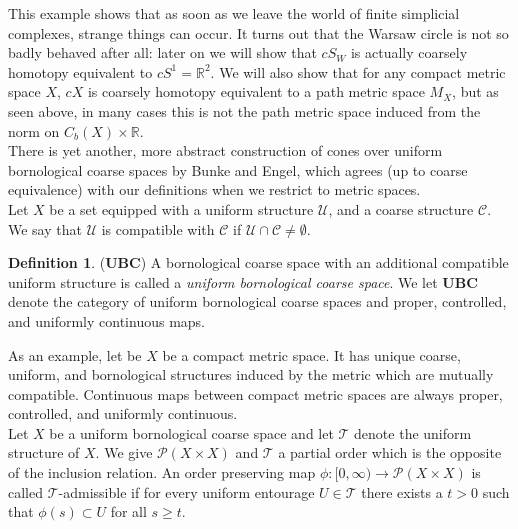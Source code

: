 \documentclass[a4paper,11pt]{article}
\theoremstyle{definition}
\newtheorem{definition}{Definition}[section]
\theoremstyle{plain}
\theoremstyle{remark}
\begin{document}
This example shows that as soon as we leave the world of finite simplicial complexes, strange things can occur. It turns out that the Warsaw circle is not so badly behaved after all: later on we will show that $cS_{W}$ is actually coarsely homotopy equivalent to $cS^1 = \mathbb{R}^2$. We will also show that for any compact metric space $X$, $cX$ is coarsely homotopy equivalent to a path metric space $M_{X}$, but as seen above, in many cases this is not the path metric space induced from the norm on $C_{b}(X) \times \mathbb{R}$. \\

There is yet another, more abstract construction of cones over uniform bornological coarse spaces by Bunke and Engel, which agrees (up to coarse equivalence) with our definitions when we restrict to metric spaces. \\

Let $X$ be a set equipped with a uniform structure $\mathcal{U}$, and a coarse structure $\mathcal{C}$. We say that $\mathcal{U}$ is compatible with $\mathcal{C}$ if $\mathcal{U}\cap \mathcal{C} \neq \emptyset$. 

\begin{definition} ($\mathbf{UBC}$) A bornological coarse space with an additional compatible uniform structure is called a \textit{uniform bornological coarse space}. We let $\mathbf{UBC}$ denote the category of uniform bornological coarse spaces and proper, controlled, and uniformly continuous maps. 
\end{definition}

As an example, let be $X$ be a compact metric space. It has unique coarse, uniform, and bornological structures induced by the metric which are mutually compatible. Continuous maps between compact metric spaces are always proper, controlled, and uniformly continuous. \\

Let $X$ be a uniform bornological coarse space and let $\mathcal{T}$ denote the uniform structure of $X$. We give $\mathcal{P}(X\times X)$ and $\mathcal{T}$ a partial order which is the opposite of the inclusion relation. An order preserving map $\phi: [0,\infty)\rightarrow \mathcal{P}(X\times X)$ is called $\mathcal{T}$-admissible if for every uniform entourage $U\in \mathcal{T}$ there exists a $t>0$ such that $\phi(s)\subset U$ for all $s\geq t$. 
\end{document}
